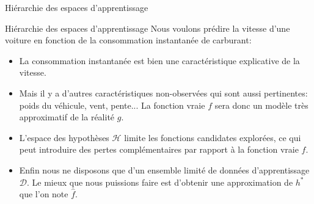 \begin{frame}[fragile]{Hiérarchie des espaces d'apprentissage}
	\hspace*{+1.0cm}
\end{frame}

\begin{frame}{Hiérarchie des espaces d'apprentissage}
	Nous voulons prédire la vitesse d'une voiture en fonction de la consommation instantanée de carburant:
	\pause
	\begin{itemize}
		\item La consommation instantanée est bien une caractéristique explicative de la vitesse.
		\pause
		\item Mais il y a d'autres caractéristiques non-observées qui sont aussi pertinentes: poids du véhicule, vent, pente... La fonction vraie $f$ sera donc un modèle très approximatif de la réalité $g$.
		\pause
		\item L'espace des hypothèses $\mathcal{H}$ limite les fonctions candidates explorées, ce qui peut introduire des pertes complémentaires par rapport à la fonction vraie $f$.
		\pause
		\item Enfin nous ne disposons que d'un ensemble limité de données d'apprentissage $\mathcal{D}$. Le mieux que nous puissions faire est d'obtenir une approximation de $h^{*}$ que l'on note $\hat{f}$.
	\end{itemize}
\end{frame}

